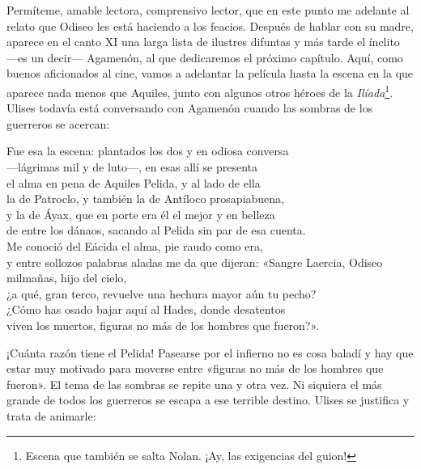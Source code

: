 Permíteme, amable lectora, comprensivo lector, que en este punto me adelante al relato que Odiseo les está haciendo a los feacios. Después de hablar con su madre, aparece en el canto XI una larga lista de ilustres difuntas y más tarde el ínclito ---es un decir--- Agamenón, al que dedicaremos el próximo capítulo. Aquí, como buenos aficionados al cine, vamos a adelantar la película hasta la escena en la que aparece nada menos que Aquiles, junto con algunos otros héroes de la \emph{Ilíada}\footnote{Escena que también se salta Nolan. ¡Ay, las exigencias del guion!}. Ulises todavía está conversando con Agamenón cuando las sombras de los guerreros se acercan:

\begin{versocita}
Fue esa la escena: plantados los dos y en odiosa conversa\\
---lágrimas mil y de luto---, en esas allí se presenta\\
el alma en pena de Aquiles Pelida, y al lado de ella\\
la de Patroclo, y también la de Antíloco prosapiabuena,\\
y la de Áyax, que en porte era él el mejor y en belleza\\
de entre los dánaos, sacando al Pelida sin par de esa cuenta.\\
Me conoció del Eácida el alma, pie raudo como era,\\
y entre sollozos palabras aladas me da que dijeran:
\stanzabreak
«Sangre Laercia, Odiseo milmañas, hijo del cielo,\\
¿a qué, gran terco, revuelve una hechura mayor aún tu pecho?\\
¿Cómo has osado bajar aquí al Hades, donde desatentos\\
viven los muertos, figuras no más de los hombres que fueron?».
\end{versocita}

¡Cuánta razón tiene el Pelida! Pasearse por el infierno no es cosa baladí y hay que estar muy motivado para moverse entre «figuras no más de los hombres que fueron». El tema de las sombras se repite una y otra vez. Ni siquiera el más grande de todos los guerreros se escapa a ese terrible destino. Ulises se justifica y trata de animarle:


